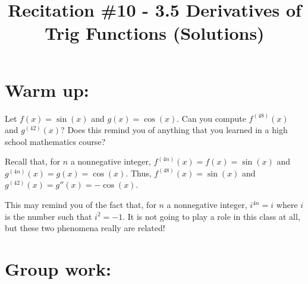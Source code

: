 \documentclass[nooutcomes]{ximera}
\title{Recitation \#10 - 3.5 Derivatives of Trig Functions (Solutions)}
\begin{document}
\begin{abstract}		\end{abstract}
\maketitle

\section*{Warm up:} 
Let $f(x) = \sin(x)$ and $g(x) = \cos(x)$.  Can you compute $f^{(48)}(x)$ and $g^{(42)}(x)$?  Does this remind you of anything that you learned in a high school mathematics course?
	\begin{freeResponse}
	Recall that, for $n$ a nonnegative integer, $f^{(4n)}(x) = f(x) = \sin(x)$ and $g^{(4n)}(x) = g(x) = \cos(x)$.  Thus, $f^{(48)}(x) = \sin(x)$ and $g^{(42)}(x) = g''(x) = - \cos(x)$.  

	This may remind you of the fact that, for $n$ a nonnegative integer, $i^{4n} = i$ where $i$ is the number such that $i^2 = -1$.  It is not going to play a role in this class at all, but these two phenomena really are related!
	\end{freeResponse}	
	
	
	
	
	

\section*{Group work:}
\end{document}
